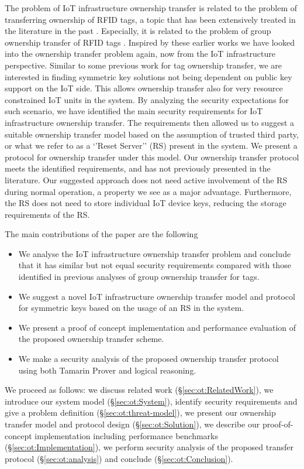 {The problem of IoT infrastructure ownership transfer is related to the problem of transferring ownership of RFID tags, a topic that has been extensively treated in the literature in the past \cite{taqieddin2018tag}. Especially, it is related to the problem of group ownership transfer of RFID tags \cite{zuo2010changing}\cite{kapoor2011multi}\cite{He2014}. Inspired by these earlier works we have looked into the ownership transfer problem again, now from the IoT infrastructure perspective.  Similar to some previous work for tag ownership transfer, we are interested in finding symmetric key solutions not being dependent on public key support on the IoT side. This allows ownership transfer also for very resource constrained IoT units in the system\cite{Eisenbarth2007}. By analyzing the security expectations for such scenario, we have identified the main security requirements for IoT infrastructure ownership transfer. The requirements then allowed us to suggest a suitable ownership transfer model based on the assumption of trusted third party, or what we refer to as a ‘’Reset Server’’ (RS) present in the system. We present a protocol for ownership transfer under this model. 
Our ownership transfer protocol meets the identified requirements, and has not previously presented in the literature. Our suggested approach does not need active involvement of the RS during normal operation, a property we see as a major advantage. Furthermore, the RS does not need to store individual IoT device keys, reducing the storage requirements of the RS.

The main contributions of the paper are the following
\begin{itemize}
    \item We analyse the IoT infrastructure ownership transfer problem and conclude that it has similar but not equal security requirements compared with those identified in previous analyses of group ownership transfer for tags.
    \item We suggest a novel IoT infrastructure ownership transfer model and protocol for symmetric keys based on the usage of an RS in the system.
    \item We present a proof of concept implementation and performance evaluation of the proposed ownership transfer scheme.
    \item We make a security analysis of the proposed ownership transfer protocol using both Tamarin Prover and logical reasoning.
\end{itemize}

We proceed as follows: we discuss related work (\S \ref{sec:ot:RelatedWork}), we introduce our system model (\S \ref{sec:ot:System}), identify security requirements and give a problem definition (\S \ref{sec:ot:threat-model}), we present our ownership transfer model and protocol design (\S \ref{sec:ot:Solution}), we describe our proof-of-concept implementation including performance benchmarks (\S \ref{sec:ot:Implementation}), we perform  security analysis of the proposed transfer protocol (\S \ref{sec:ot:analysis}) and conclude (\S \ref{sec:ot:Conclusion}).

}
